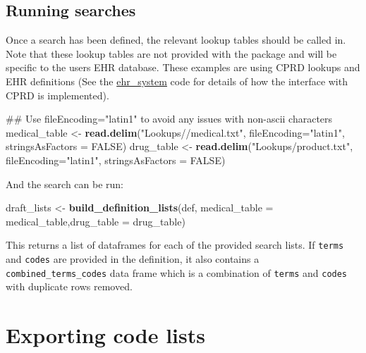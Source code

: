 \documentclass[]{article}
\newenvironment{Shaded}{\begin{snugshade}}{\end{snugshade}}
\newcommand{\KeywordTok}[1]{\textcolor[rgb]{0.13,0.29,0.53}{\textbf{{#1}}}}
\newcommand{\DataTypeTok}[1]{\textcolor[rgb]{0.13,0.29,0.53}{{#1}}}
\newcommand{\StringTok}[1]{\textcolor[rgb]{0.31,0.60,0.02}{{#1}}}
\newcommand{\OtherTok}[1]{\textcolor[rgb]{0.56,0.35,0.01}{{#1}}}
\newcommand{\NormalTok}[1]{{#1}}
\begin{document}
\subsection{Running searches}\label{running-searches}

Once a search has been defined, the relevant lookup tables should be
called in. Note that these lookup tables are not provided with the
package and will be specific to the users EHR database. These examples
are using CPRD lookups and EHR definitions (See the
\href{https://github.com/rOpenHealth/rpcdsearch/blob/master/R/ehr_system.R}{ehr\_system}
code for details of how the interface with CPRD is implemented).

\begin{Shaded}
\begin{Highlighting}[]
\NormalTok{## Use fileEncoding="latin1" to avoid any issues with non-ascii characters}
\NormalTok{medical_table <-}\StringTok{ }\KeywordTok{read.delim}\NormalTok{(}\StringTok{"Lookups//medical.txt"}\NormalTok{, }\DataTypeTok{fileEncoding=}\StringTok{"latin1"}\NormalTok{, }\DataTypeTok{stringsAsFactors =} \OtherTok{FALSE}\NormalTok{)}
\NormalTok{drug_table <-}\StringTok{ }\KeywordTok{read.delim}\NormalTok{(}\StringTok{"Lookups/product.txt"}\NormalTok{, }\DataTypeTok{fileEncoding=}\StringTok{"latin1"}\NormalTok{, }\DataTypeTok{stringsAsFactors =} \OtherTok{FALSE}\NormalTok{)}
\end{Highlighting}
\end{Shaded}

And the search can be run:

\begin{Shaded}
\begin{Highlighting}[]
\NormalTok{draft_lists <-}\StringTok{ }\KeywordTok{build_definition_lists}\NormalTok{(def, }\DataTypeTok{medical_table =} \NormalTok{medical_table,}\DataTypeTok{drug_table =} \NormalTok{drug_table)}
\end{Highlighting}
\end{Shaded}

This returns a list of dataframes for each of the provided search lists.
If \texttt{terms} and \texttt{codes} are provided in the definition, it
also contains a \texttt{combined\_terms\_codes} data frame which is a
combination of \texttt{terms} and \texttt{codes} with duplicate rows
removed.

\section{Exporting code lists}\label{exporting-code-lists}
\end{document}
